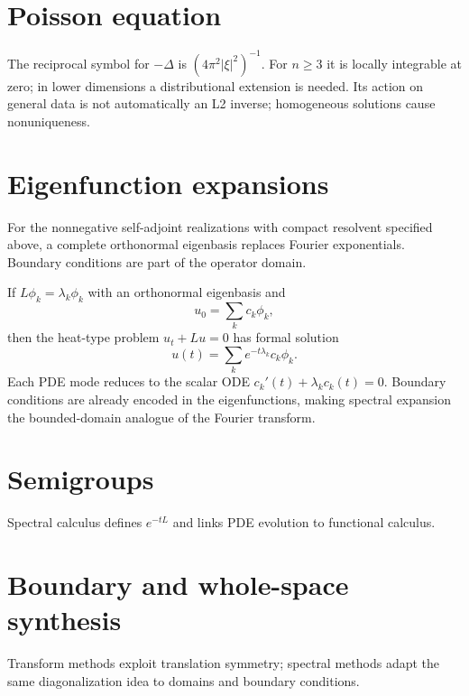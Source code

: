 \section{Poisson equation}
The reciprocal symbol for $-\Delta$ is $(4\pi^2|\xi|^2)^{-1}$. For $n\ge3$ it is locally integrable at zero; in lower dimensions a distributional extension is needed. Its action on general data is not automatically an L2 inverse; homogeneous solutions cause nonuniqueness.

\section{Eigenfunction expansions}
For the nonnegative self-adjoint realizations with compact resolvent specified above, a complete orthonormal eigenbasis replaces Fourier exponentials. Boundary conditions are part of the operator domain.


\begin{example}\label{ex:iii28-expand-03}
If \(L\phi_k=\lambda_k\phi_k\) with an orthonormal eigenbasis and
\[
u_0=\sum_k c_k\phi_k,
\]
then the heat-type problem \(u_t+Lu=0\) has formal solution
\[
u(t)=\sum_k e^{-t\lambda_k}c_k\phi_k.
\]
Each PDE mode reduces to the scalar ODE
\(c_k'(t)+\lambda_kc_k(t)=0\). Boundary conditions are already encoded in the
eigenfunctions, making spectral expansion the bounded-domain analogue of the
Fourier transform.
\end{example}
\section{Semigroups}
Spectral calculus defines $e^{-tL}$ and links PDE evolution to functional calculus.

\section{Boundary and whole-space synthesis}
Transform methods exploit translation symmetry; spectral methods adapt the same diagonalization idea to domains and boundary conditions.


